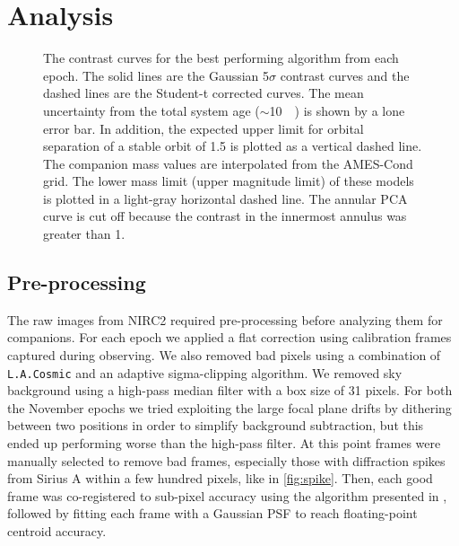 \documentclass[twocolumn]{aastex631}
\begin{document}
\section{Analysis} \label{sec:analysis}

\begin{figure*}
    \centering
    \caption{The contrast curves for the best performing algorithm from each epoch. The solid lines are the Gaussian 5$\sigma$ contrast curves and the dashed lines are the Student-t corrected curves. The mean uncertainty from the total system age ($\sim$\qty{10}{\mega\year}) is shown by a lone error bar. In addition, the expected upper limit for orbital separation of a stable orbit of \qty{1.5}{\au} is plotted as a vertical dashed line. The companion mass values are interpolated from the AMES-Cond grid. The lower mass limit (upper magnitude limit) of these models is plotted in a light-gray horizontal dashed line. The annular PCA curve is cut off because the contrast in the innermost annulus was greater than 1.}
    \label{fig:contrast}
\end{figure*}

\subsection{Pre-processing}

The raw images from NIRC2 required pre-processing before analyzing them for companions. For each epoch we applied a flat correction using calibration frames captured during observing. We also removed bad pixels using a combination of \texttt{L.A.Cosmic} \citep{van_dokkum_cosmic-ray_2001} and an adaptive sigma-clipping algorithm. We removed sky background using a high-pass median filter with a box size of 31 pixels. For both the November epochs we tried exploiting the large focal plane drifts by dithering between two positions in order to simplify background subtraction, but this ended up performing worse than the high-pass filter. At this point frames were manually selected to remove bad frames, especially those with diffraction spikes from Sirius A within a few hundred pixels, like in \autoref{fig:spike}. Then, each good frame was co-registered to sub-pixel accuracy using the algorithm presented in \citet{guizar-sicairos_efficient_2008}, followed by fitting each frame with a Gaussian PSF to reach floating-point centroid accuracy.
\end{document}
